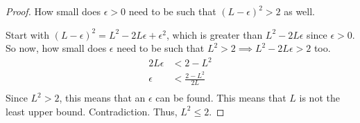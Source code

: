 \documentclass{report}
\begin{document}
\begin{enumerate}
\begin{proof}
        How small does $\epsilon > 0$ need to be such that $(L-\epsilon)^2 >2$ as well. 

        Start with $(L-\epsilon)^2 = L^2 - 2L\epsilon + \epsilon^2$, which is greater than $L^2 - 2L\epsilon$ since $\epsilon > 0$. So now, how small does $\epsilon$ need to be such that $L^2 > 2 \implies L^2 - 2L\epsilon > 2$ too. 
        \begin{align*}
            2L\epsilon &< 2 - L^2 \\
            \epsilon &< \frac{2 - L^2}{2L} \\
        \end{align*}
        Since $L^2 > 2$, this means that an $\epsilon$ can be found. This means that $L$ is not the least upper bound. Contradiction. Thus, $L^2 \leq 2$.
    \end{proof}
\end{enumerate}
\newpage
\end{document}
